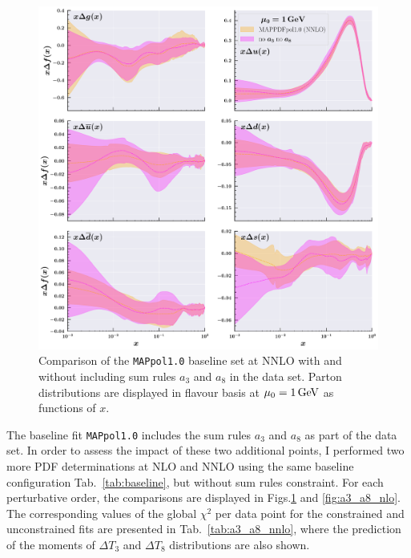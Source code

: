 \begin{figure}[t!]
  \centering
  \includegraphics[width=\textwidth]{Chapters/Chapter_4/figs/a3_a8_nnlo.pdf}
  \caption{\small{Comparison of the \texttt{MAPpol1.0} baseline set at NNLO with and without including sum rules $a_3$ and $a_8$ in the data set. Parton distributions are displayed in flavour basis at $\mu_0 = 1 \, \textrm{GeV}$ as functions of $x$.}}
  \label{fig:a3_a8_nnlo}
\end{figure}

The baseline fit \texttt{MAPpol1.0} includes the sum rules $a_3$ and $a_8$ as part of the data set. In order to assess the impact of these two additional points, I performed two more PDF determinations at NLO and NNLO using the same baseline configuration Tab.~\ref{tab:baseline}, but without sum rules constraint. For each perturbative order, the comparisons are displayed in Figs.\ref{fig:a3_a8_nnlo} and \ref{fig:a3_a8_nlo}. The corresponding values of the global $\chi^2$ per data point for the constrained and unconstrained fits are presented in Tab.~\ref{tab:a3_a8_nnlo}, where the prediction of the moments of $\Delta T_3$ and $\Delta T_8$ distributions are also shown.%

